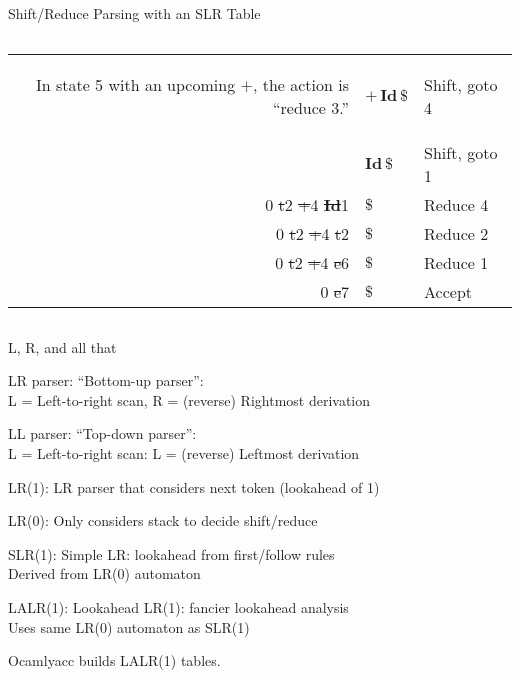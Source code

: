\documentclass{plt}
\newcommand{\id}{\textbf{Id}}
\begin{document}
\begin{frame}[t]{Shift/Reduce Parsing with an SLR Table}
\begin{columns}
\begin{column}{0.55\textwidth}
\begin{tabular}{r|ll}
\begin{onlyenv}
\begin{reason}
          In state 5 with an upcoming $+$, the action is ``reduce 3.''
        \end{reason}
      \end{onlyenv}
\onslide<6->{%
      \st{ }0 \st{t}2 & $ +\, \id \,\$$ & Shift, goto 4 \\}
      \begin{onlyenv}<6>
        \begin{reason}
          This time, we strip off the RHS for rule 3, the handle $\id * t$,
          exposing state 0, so we push a $t$ with state 2.
        \end{reason}
      \end{onlyenv}
\onslide<7->{
      \st{ }0 \st{t}2 \st{+}4 & $ \id \,\$$ & Shift, goto 1 \\
      \st{ }0 \st{t}2 \st{+}4 \st{\id}1 & $\$$ & Reduce 4 \\
      \st{ }0 \st{t}2 \st{+}4 \st{t}2 & $\$$ & Reduce 2 \\
      \st{ }0 \st{t}2 \st{+}4 \st{e}6 & $\$$ & Reduce 1 \\
      \st{ }0 \st{e}7 & $\$$ & Accept} \\
      \bottomrule
    \end{tabular}
  \end{column}
\end{columns}

\end{frame}

\begin{frame}{L, R, and all that}

LR parser: ``Bottom-up parser'': \\
L = Left-to-right scan, R = (reverse) Rightmost derivation

LL parser: ``Top-down parser'': \\
L = Left-to-right scan: L = (reverse) Leftmost derivation

LR(1): LR parser that considers next token (lookahead of 1)

LR(0): Only considers stack to decide shift/reduce

SLR(1): Simple LR: lookahead from first/follow rules \\
Derived from LR(0) automaton

LALR(1): Lookahead LR(1): fancier lookahead analysis \\
Uses same LR(0) automaton as SLR(1)

Ocamlyacc builds LALR(1) tables.

\end{frame}
\end{document}
